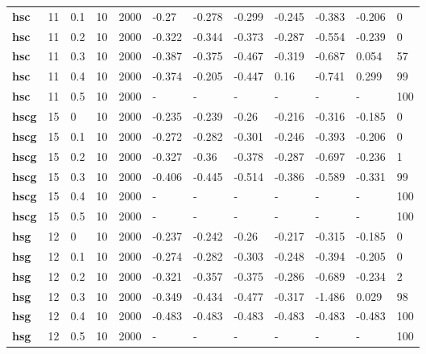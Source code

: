 \begin{longtable}[h]{|p{0.8cm}|p{1.5cm}|p{1cm}|p{1cm}|p{1cm}|p{1cm}|p{1cm}|p{1cm}|p{1cm}|p{1cm}|p{1cm}|p{1.5cm}|}
           \\
  \textbf{hsc } &  11         & 0.1 & 10 & 2000 &  -0.27 & -0.278 & -0.299 & -0.245 & -0.383 & -0.206 &   0
           \\
  \textbf{hsc } &  11         & 0.2 & 10 & 2000 & -0.322 & -0.344 & -0.373 & -0.287 & -0.554 & -0.239 &   0
           \\
  \textbf{hsc } &  11         & 0.3 & 10 & 2000 & -0.387 & -0.375 & -0.467 & -0.319 & -0.687 &  0.054 &  57
           \\
  \textbf{hsc } &  11         & 0.4 & 10 & 2000 & -0.374 & -0.205 & -0.447 &   0.16 & -0.741 &  0.299 &  99
           \\
  \textbf{hsc } &  11         & 0.5 & 10 & 2000 & - & - & - & - & - & - & 100
           \\
  \textbf{hscg} &  15         &   0 & 10 & 2000 & -0.235 & -0.239 &  -0.26 & -0.216 & -0.316 & -0.185 &   0
           \\
  \textbf{hscg} &  15         & 0.1 & 10 & 2000 & -0.272 & -0.282 & -0.301 & -0.246 & -0.393 & -0.206 &   0
           \\
  \textbf{hscg} &  15         & 0.2 & 10 & 2000 & -0.327 &  -0.36 & -0.378 & -0.287 & -0.697 & -0.236 &   1
           \\
  \textbf{hscg} &  15         & 0.3 & 10 & 2000 & -0.406 & -0.445 & -0.514 & -0.386 & -0.589 & -0.331 &  99
           \\
  \textbf{hscg} &  15         & 0.4 & 10 & 2000 & - & - & - & - & - & - & 100
           \\
  \textbf{hscg} &  15         & 0.5 & 10 & 2000 & - & - & - & - & - & - & 100
           \\
  \textbf{hsg } &  12         &   0 & 10 & 2000 & -0.237 & -0.242 &  -0.26 & -0.217 & -0.315 & -0.185 &   0
           \\
  \textbf{hsg } &  12         & 0.1 & 10 & 2000 & -0.274 & -0.282 & -0.303 & -0.248 & -0.394 & -0.205 &   0
           \\
  \textbf{hsg } &  12         & 0.2 & 10 & 2000 & -0.321 & -0.357 & -0.375 & -0.286 & -0.689 & -0.234 &   2
           \\
  \textbf{hsg } &  12         & 0.3 & 10 & 2000 & -0.349 & -0.434 & -0.477 & -0.317 & -1.486 &  0.029 &  98
           \\
  \textbf{hsg } &  12         & 0.4 & 10 & 2000 & -0.483 & -0.483 & -0.483 & -0.483 & -0.483 & -0.483 & 100
           \\
  \textbf{hsg } &  12         & 0.5 & 10 & 2000 & - & - & - & - & - & - & 100
           \\
 \end{longtable}
